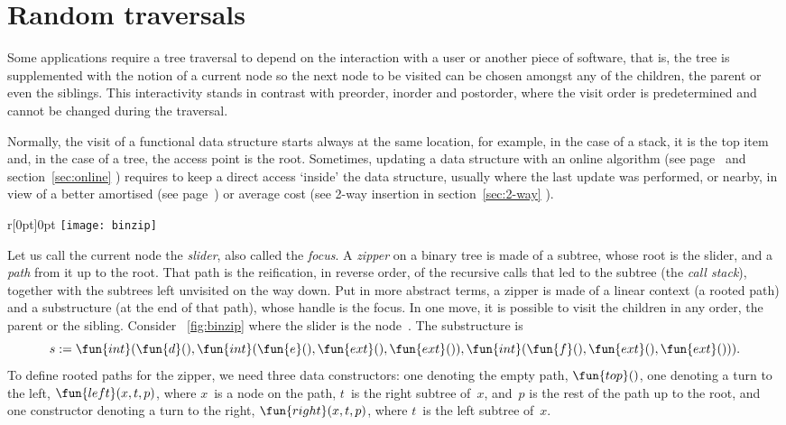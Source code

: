 \section{Random traversals}

Some applications require a tree traversal to depend on the
interaction with a user or another piece of software, that is, the
tree is supplemented with the notion of a current node so the next
node to be visited can be chosen amongst any of the children, the
parent or even the siblings. This interactivity stands in contrast
with preorder, inorder and postorder, where the visit order is
predetermined and cannot be changed during the traversal.

Normally, the visit of a functional data structure starts always at
the same location, for example, in the case of a stack, it is the top
item and, in the case of a tree, the access point is the
root. Sometimes, updating a data structure with an online algorithm
(see page~\pageref{par:online_vs_offline} and section~\ref{sec:online}
) requires to keep a direct access `inside' the
data structure, usually where the last update was performed, or
nearby, in view of a better amortised (see
page~\pageref{par:amortised_cost}) or average cost (see 2-way
insertion in section~\ref{sec:2-way} ).

\begin{wrapfigure}[8]{r}[0pt]{0pt}
\centering
\texttt{[image: binzip]}
\caption{}
\label{fig:binzip}
\end{wrapfigure}
Let us call the current node the \emph{slider}, also called the \emph{focus}. A
\emph{zipper} on a binary tree is made of a
subtree, whose root is the slider, and a \emph{path} from it up to the
root. That path is the reification, in reverse order, of the recursive
calls that led to the subtree (the \emph{call stack}), together with the subtrees left unvisited on
the way down. Put in more abstract terms, a zipper is made of a linear
context (a rooted path) and a substructure (at the end of that path),
whose handle is the focus. In one move, it is possible to visit the
children in any order, the parent or the sibling. Consider
\fig~\ref{fig:binzip} where the slider is the node~. The
substructure is
\begin{equation*}
  s := \fun{int}(\fun{d}(),\fun{int}(\fun{e}(),\fun{ext}(),\fun{ext}()),
       \fun{int}(\fun{f}(),\fun{ext}(),\fun{ext}())).
\end{equation*}
To define rooted paths for the zipper, we need three data
constructors: one denoting the empty path, \(\fun{top}()\), one
denoting a turn to the left, \(\fun{left}(x,t,p)\), where \(x\)~is a
node on the path, \(t\)~is the right subtree of~\(x\), and~\(p\) is
the rest of the path up to the root, and one constructor denoting a
turn to the right, \(\fun{right}(x,t,p)\), where \(t\)~is the left
subtree of~\(x\).

